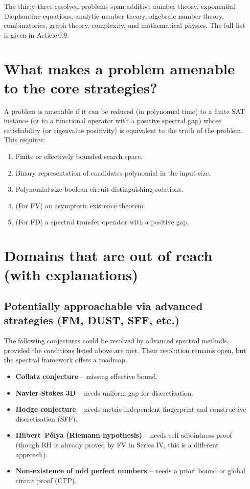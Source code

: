 \documentclass[11pt,a4paper]{article}
\begin{document}
The thirty‑three resolved problems span additive number theory, exponential Diophantine equations, analytic number theory, algebraic number theory, combinatorics, graph theory, complexity, and mathematical physics. The full list is given in Article 0.9.

\section{What makes a problem amenable to the core strategies?}

A problem is amenable if it can be reduced (in polynomial time) to a finite SAT instance (or to a functional operator with a positive spectral gap) whose satisfiability (or eigenvalue positivity) is equivalent to the truth of the problem. This requires:
\begin{enumerate}
\item Finite or effectively bounded search space.
\item Binary representation of candidates polynomial in the input size.
\item Polynomial‑size boolean circuit distinguishing solutions.
\item (For FV) an asymptotic existence theorem.
\item (For FD) a spectral transfer operator with a positive gap.
\end{enumerate}

\section{Domains that are out of reach (with explanations)}

\subsection{Potentially approachable via advanced strategies (FM, DUST, SFF, etc.)}
The following conjectures could be resolved by advanced spectral methods, provided the conditions listed above are met. Their resolution remains open, but the spectral framework offers a roadmap.
\begin{itemize}
\item \textbf{Collatz conjecture} – missing effective bound.
\item \textbf{Navier‑Stokes 3D} – needs uniform gap for discretisation.
\item \textbf{Hodge conjecture} – needs metric‑independent fingerprint and constructive discretisation (SFF).
\item \textbf{Hilbert–Pólya (Riemann hypothesis)} – needs self‑adjointness proof (though RH is already proved by FV in Series IV, this is a different approach).
\item \textbf{Non‑existence of odd perfect numbers} – needs a priori bound or global circuit proof (CTP).
\end{itemize}
\end{document}
